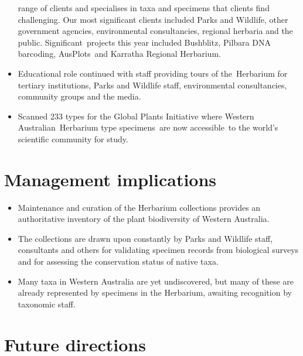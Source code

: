 \documentclass[version=last,
    paper=a4, %
    10pt, %
    usenames,
    dvipsnames,
    oneside, %
    headings=openany, %
    DIV=15 %
]{scrbook}
\begin{document}
\begin{itemize}
  range of clients and specialises in taxa and specimens that clients
  find challenging. Our most significant clients included Parks and
  Wildlife, other government agencies, environmental consultancies,
  regional herbaria and the public. Significant~projects this year
  included Bushblitz, Pilbara DNA barcoding, AusPlots~and Karratha
  Regional Herbarium.
\item
  Educational role continued with staff providing tours of the~Herbarium
  for tertiary institutions, Parks and Wildlife staff, environmental
  consultancies, community groups and the media.
\item
  Scanned 233 types for the Global Plants Initiative where Western
  Australian~Herbarium type specimens~are now accessible~to the world's
  scientific community for study.
\end{itemize}




\section*{Management implications}

\begin{itemize}
\itemsep1pt\parskip0pt
\item
  Maintenance and curation of the Herbarium collections provides an
  authoritative inventory of the plant biodiversity of Western
  Australia.
\item
  The collections are drawn upon constantly by Parks and Wildlife staff,
  consultants and others for validating specimen records from biological
  surveys and for assessing the conservation status of native taxa.
\item
  Many taxa in Western Australia are yet undiscovered, but many of these
  are already represented by specimens in the Herbarium, awaiting
  recognition by taxonomic staff.
\end{itemize}




\section*{Future directions}
\end{document}
